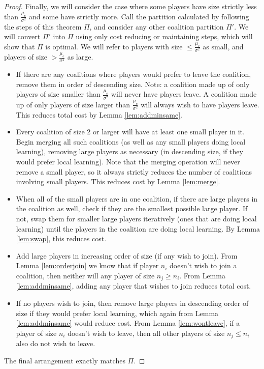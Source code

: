 \documentclass{article}
\newcommand{\mue}[0]{\ensuremath{\mu_e}}
\newcommand{\var}[0]{\ensuremath{\sigma^2}}
\newcommand{\ndraw}[0]{\ensuremath{n}}
\newcommand{\partition}[0]{\ensuremath{\Pi}}
\begin{document}
\begin{proof}
Finally, we will consider the case where some players have size strictly less than $\frac{\mue}{\var}$ and some have strictly more. Call the partition calculated by following the steps of this theorem $\partition$, and consider any other coalition partition $\partition'$. We will convert $\partition'$ into $\partition$ using only cost reducing or maintaining steps, which will show that $\partition$ is optimal. We will refer to players with size $\leq \frac{\mue}{\var}$ as small, and players of size $> \frac{\mue}{\var}$ as large. 
\begin{itemize}
    \item If there are any coalitions where players would prefer to leave the coalition, remove them in order of descending size. Note: a coalition made up of only players of size smaller than $\frac{\mue}{\var}$ will never have players leave. A coalition made up of only players of size larger than $\frac{\mue}{\var}$ will always wish to have players leave. This reduces total cost by Lemma \ref{lem:addminsame}. 
    \item Every coalition of size 2 or larger will have at least one small player in it. Begin merging all such coalitions (as well as any small players doing local learning), removing large players as necessary (in descending size, if they would prefer local learning). Note that the merging operation will never remove a small player, so it always strictly reduces the number of coalitions involving small players. This reduces cost by Lemma \ref{lem:merge}. 
    \item When all of the small players are in one coalition, if there are large players in the coalition as well, check if they are the smallest possible large player. If not, swap them for smaller large players iteratively (ones that are doing local learning) until the players in the coalition are doing local learning. By Lemma \ref{lem:swap}, this reduces cost.  
    \item Add large players in increasing order of size (if any wish to join). From Lemma \ref{lem:orderjoin} we know that if player $\ndraw_i$ doesn't wish to join a coalition, then neither will any player of size $\ndraw_j\geq \ndraw_i$. From Lemma \ref{lem:addminsame}, adding any player that wishes to join reduces total cost. 
    \item If no players wish to join, then remove large players in descending order of size if they would prefer local learning, which again from Lemma \ref{lem:addminsame} would reduce cost. From Lemma \ref{lem:wontleave}, if a player of size $\ndraw_i$ doesn't wish to leave, then all other players of size $\ndraw_j\leq \ndraw_i$ also do not wish to leave.
\end{itemize}
The final arrangement exactly matches $\partition$. 
\end{proof}
\end{document}
